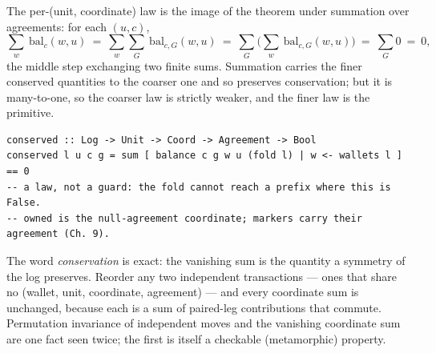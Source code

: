 The per-(unit, coordinate) law is the image of the theorem under summation over agreements:
for each $(u,c)$,
\[
\sum_{w}\ \mathrm{bal}_c(w,u)\ =\ \sum_{w}\sum_{G}\ \mathrm{bal}_{c,G}(w,u)\ =\ \sum_{G}\Big(\sum_{w}\ \mathrm{bal}_{c,G}(w,u)\Big)\ =\ \sum_{G} 0\ =\ 0,
\]
the middle step exchanging two finite sums. Summation carries the finer conserved
quantities to the coarser one and so preserves conservation; but it is many-to-one, so the
coarser law is strictly weaker, and the finer law is the primitive.

\begin{lstlisting}
conserved :: Log -> Unit -> Coord -> Agreement -> Bool
conserved l u c g = sum [ balance c g w u (fold l) | w <- wallets l ] == 0
-- a law, not a guard: the fold cannot reach a prefix where this is False.
-- owned is the null-agreement coordinate; markers carry their agreement (Ch. 9).
\end{lstlisting}

The word \emph{conservation} is exact: the vanishing sum is the quantity a
symmetry of the log preserves. Reorder any two independent transactions --- ones
that share no (wallet, unit, coordinate, agreement) --- and every coordinate sum is
unchanged, because each is a sum of paired-leg contributions that commute.
Permutation invariance of independent moves and the vanishing coordinate sum are
one fact seen twice; the first is itself a checkable (metamorphic) property.

